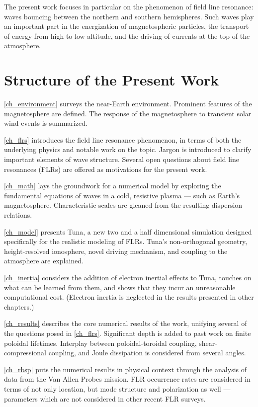 The present work focuses in particular on the phenomenon of field line resonance: \Alfven waves bouncing between the northern and southern hemispheres. Such waves play an important part in the energization of magnetospheric particles, the transport of energy from high to low altitude, and the driving of currents at the top of the atmosphere. 

\section{Structure of the Present Work}

\cref{ch_environment} surveys the near-Earth environment. Prominent features of the magnetosphere are defined. The response of the magnetosphere to transient solar wind events is summarized. 

\cref{ch_flrs} introduces the field line resonance phenomenon, in terms of both the underlying physics and notable work on the topic. Jargon is introduced to clarify important elements of wave structure. Several open questions about field line resonances (FLRs) are offered as motivations for the present work. 

\cref{ch_math} lays the groundwork for a numerical model by exploring the fundamental equations of waves in a cold, resistive plasma --- such as Earth's magnetosphere. Characteristic scales are gleaned from the resulting dispersion relations. 

\cref{ch_model} presents Tuna, a new two and a half dimensional simulation designed specifically for the realistic modeling of FLRs. Tuna's non-orthogonal geometry, height-resolved ionosphere, novel driving mechanism, and coupling to the atmosphere are explained. 

\cref{ch_inertia} considers the addition of electron inertial effects to Tuna, touches on what can be learned from them, and shows that they incur an unreasonable computational cost. (Electron inertia is neglected in the results presented in other chapters.)

\cref{ch_results} describes the core numerical results of the work, unifying several of the questions posed in \cref{ch_flrs}. Significant depth is added to past work on finite poloidal lifetimes\cite{mann_1995,radoski_1974}. Interplay between poloidal-toroidal coupling, shear-compressional coupling, and Joule dissipation is considered from several angles. 

\cref{ch_rbsp} puts the numerical results in physical context through the analysis of data from the Van Allen Probes mission. FLR occurrence rates are considered in terms of not only location, but mode structure and polarization as well --- parameters which are not considered in other recent FLR surveys\cite{dai_2015,motoba_2015}. 

